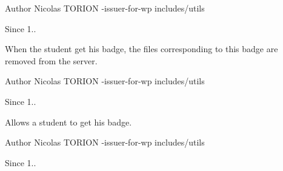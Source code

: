 \begin{DoxyAuthor}{Author}
Nicolas T\+O\+R\+I\+ON -\/issuer-\/for-\/wp  includes/utils 
\end{DoxyAuthor}
\begin{DoxySince}{Since}
1..
\end{DoxySince}
When the student get his badge, the files corresponding to this badge are removed from the server.

\begin{DoxyAuthor}{Author}
Nicolas T\+O\+R\+I\+ON -\/issuer-\/for-\/wp  includes/utils 
\end{DoxyAuthor}
\begin{DoxySince}{Since}
1..
\end{DoxySince}
Allows a student to get his badge.

\begin{DoxyAuthor}{Author}
Nicolas T\+O\+R\+I\+ON -\/issuer-\/for-\/wp  includes/utils 
\end{DoxyAuthor}
\begin{DoxySince}{Since}
1.. 
\end{DoxySince}
